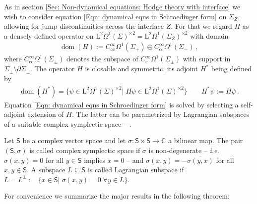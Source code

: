 As in section \ref{Sec: Non-dynamical equations: Hodge theory with interface} we wish to consider equation \eqref{Eqn: dynamical eqns in Schroedinger form} on $\Sigma_Z$, allowing for jump discontinuities across the interface $Z$.
For that we regard $H$ as a densely defined operator on $\mathrm{L}^2\Omega^1(\Sigma)^{\times 2}=\mathrm{L}^2\Omega^1(\Sigma_Z)^{\times 2}$ with domain
\begin{align}\label{Eqn: curl-Hamiltonian domain}
	\operatorname{dom}(H):=
	C^\infty_{\mathrm{cc}}\Omega^1(\Sigma_+)\oplus C^\infty_{\mathrm{cc}}\Omega^1(\Sigma_-)\,,
\end{align}
where $C^\infty_{\mathrm{cc}}\Omega^1(\Sigma_\pm)$ denotes the subspace of $C^\infty_{\mathrm{c}}\Omega^1(\Sigma_\pm)$ with support in $\Sigma_\pm\setminus\partial\Sigma_\pm$.
The operator $H$ is closable and symmetric, its adjoint $H^*$ being defined by
\begin{align}\label{Eqn: adjoint curl-Hamiltonian}
	\operatorname{dom}(H^*)=\lbrace
	\psi\in\mathrm{L}^2\Omega^1(\Sigma)^{\times 2}|\;H\psi\in\mathrm{L}^2\Omega^1(\Sigma)^{\times 2}\rbrace\qquad
	H^*\psi:=H\psi\,.
\end{align}
Equation \eqref{Eqn: dynamical eqns in Schroedinger form} is solved by selecting a self-adjoint extension of $H$.
The latter can be parametrized by Lagrangian subspaces of a suitable complex symplectic space -- \cite{Everitt-Markus-99,Everitt-Markus-03,Everitt-Markus-05}.
\begin{Definition}\label{Def: complex symplectic space, Lagrangian subspaces}
	Let $\mathsf{S}$ be a complex vector space and let $\sigma\colon\mathsf{S}\times\mathsf{S}\to\mathbb{C}$ a bilinear map.
	The pair $(\mathsf{S},\sigma)$ is called complex symplectic space if $\sigma$ is non-degenerate -- \textit{i.e.} $\sigma(x,y)=0$ for all $y\in\mathsf{S}$ implies $x=0$ -- and $\sigma(x,y)=-\overline{\sigma(y,x)}$ for all $x,y\in\mathsf{S}$.
	A subspace $L\subseteq\mathsf{S}$ is called Lagrangian subspace if $L=L^\perp:=\lbrace x\in\mathsf{S}|\;\sigma(x,y)=0\;\forall y\in L\rbrace$.
\end{Definition}
For convenience we summarize the major results in the following theorem:
